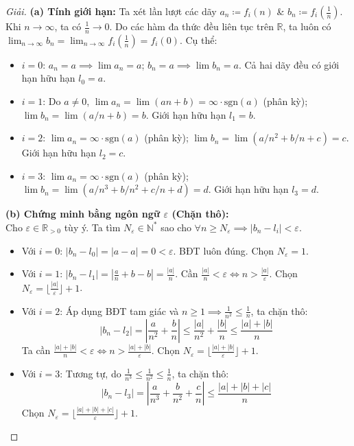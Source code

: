 \documentclass{article}
\begin{document}
\begin{proof}[Giải]
	\textbf{(a) Tính giới hạn:}
	Ta xét lần lượt các dãy $a_n\coloneqq f_i(n)$ \& $b_n\coloneqq f_i(\frac{1}{n})$. Khi $n\to\infty$, ta có $\frac{1}{n}\to0$. Do các hàm đa thức đều liên tục trên $\mathbb{R}$, ta luôn có $\lim_{n\to\infty} b_n = \lim_{n\to\infty} f_i(\frac{1}{n}) = f_i(0)$. Cụ thể:
	\begin{itemize}
		\item $i = 0$: $a_n = a \implies \lim a_n = a$; $b_n = a \implies \lim b_n = a$. Cả hai dãy đều có giới hạn hữu hạn $l_0 = a$.
		\item $i = 1$: Do $a \ne 0$, $\lim a_n = \lim (an+b) = \infty \cdot \text{sgn}(a)$ (phân kỳ); $\lim b_n = \lim (a/n + b) = b$. Giới hạn hữu hạn $l_1 = b$.
		\item $i = 2$: $\lim a_n = \infty \cdot \text{sgn}(a)$ (phân kỳ); $\lim b_n = \lim (a/n^2 + b/n + c) = c$. Giới hạn hữu hạn $l_2 = c$.
		\item $i = 3$: $\lim a_n = \infty \cdot \text{sgn}(a)$ (phân kỳ); $\lim b_n = \lim (a/n^3 + b/n^2 + c/n + d) = d$. Giới hạn hữu hạn $l_3 = d$.
	\end{itemize}
	
	\textbf{(b) Chứng minh bằng ngôn ngữ $\varepsilon$ (Chặn thô):}\\
	Cho $\varepsilon\in\mathbb{R}_{> 0}$ tùy ý. Ta tìm $N_\varepsilon\in\mathbb{N}^*$ sao cho $\forall n\ge N_\varepsilon\implies|b_n - l_i| < \varepsilon$. 
	\begin{itemize}
		\item Với $i = 0$: $|b_n - l_0| = |a - a| = 0 < \varepsilon$. BĐT luôn đúng. Chọn $N_\varepsilon = 1$.
		\item Với $i = 1$: $|b_n - l_1| = |\frac{a}{n} + b - b| = \frac{|a|}{n}$. Cần $\frac{|a|}{n} < \varepsilon \iff n > \frac{|a|}{\varepsilon}$. Chọn $N_\varepsilon = \lfloor\frac{|a|}{\varepsilon}\rfloor + 1$.
		\item Với $i = 2$: Áp dụng BĐT tam giác và $n \ge 1 \implies \frac{1}{n^2} \le \frac{1}{n}$, ta chặn thô:
		$$ |b_n - l_2| = \left| \frac{a}{n^2} + \frac{b}{n} \right| \le \frac{|a|}{n^2} + \frac{|b|}{n} \le \frac{|a| + |b|}{n} $$
		Ta cần $\frac{|a|+|b|}{n} < \varepsilon \iff n > \frac{|a|+|b|}{\varepsilon}$. Chọn $N_\varepsilon = \lfloor \frac{|a|+|b|}{\varepsilon} \rfloor + 1$.
		\item Với $i = 3$: Tương tự, do $\frac{1}{n^3} \le \frac{1}{n^2} \le \frac{1}{n}$, ta chặn thô:
		$$ |b_n - l_3| = \left| \frac{a}{n^3} + \frac{b}{n^2} + \frac{c}{n} \right| \le \frac{|a| + |b| + |c|}{n} $$
		Chọn $N_\varepsilon = \lfloor \frac{|a|+|b|+|c|}{\varepsilon} \rfloor + 1$.
	\end{itemize}
	

\end{proof}
\end{document}
